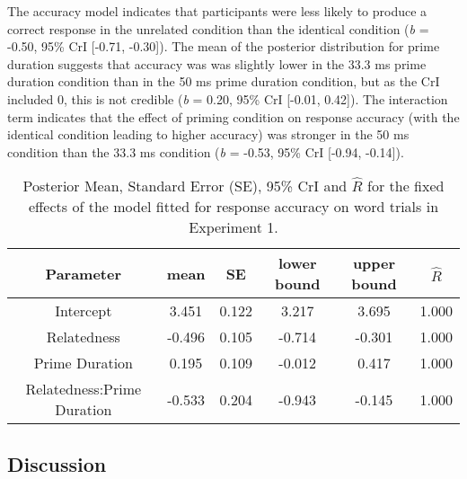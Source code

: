 \documentclass[
  english,
  man,floatsintext]{apa6}
\begin{document}
The accuracy model indicates that participants were less likely to produce a correct response in the unrelated condition than the identical condition (\emph{b} = -0.50, 95\% CrI {[}-0.71, -0.30{]}). The mean of the posterior distribution for prime duration suggests that accuracy was was slightly lower in the 33.3 ms prime duration condition than in the 50 ms prime duration condition, but as the CrI included 0, this is not credible (\emph{b} = 0.20, 95\% CrI {[}-0.01, 0.42{]}). The interaction term indicates that the effect of priming condition on response accuracy (with the identical condition leading to higher accuracy) was stronger in the 50 ms condition than the 33.3 ms condition (\emph{b} = -0.53, 95\% CrI {[}-0.94, -0.14{]}).



\begin{table}[H]

\begin{center}
\begin{threeparttable}

\caption{\label{tab:exp1-acc-blmm-table}Posterior Mean, Standard Error (SE), 95\% CrI and \(\hat{R}\) for the fixed effects of the model fitted for response accuracy on word trials in Experiment 1.}

\small{

\begin{tabular}{cccccc}
\toprule
Parameter & \multicolumn{1}{c}{mean} & \multicolumn{1}{c}{SE} & \multicolumn{1}{c}{lower bound} & \multicolumn{1}{c}{upper bound} & \multicolumn{1}{c}{$\hat{R}$}\\
\midrule
Intercept & 3.451 & 0.122 & 3.217 & 3.695 & 1.000\\
Relatedness & -0.496 & 0.105 & -0.714 & -0.301 & 1.000\\
Prime Duration & 0.195 & 0.109 & -0.012 & 0.417 & 1.000\\
Relatedness:Prime Duration & -0.533 & 0.204 & -0.943 & -0.145 & 1.000\\
\bottomrule
\end{tabular}

}

\end{threeparttable}
\end{center}

\end{table}

\hypertarget{discussion}{%
\subsection{Discussion}\label{discussion}}
\end{document}
